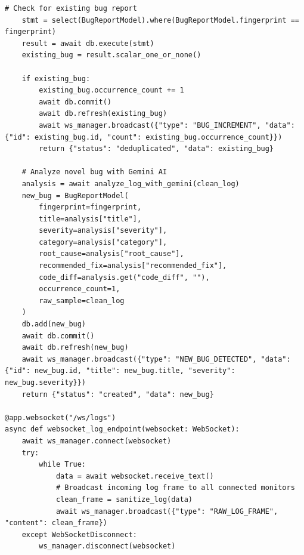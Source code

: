 \documentclass[12pt,a4paper]{article}
\begin{document}
\begin{lstlisting}[style=pystyle, caption={FastAPI Application Controller with Real-Time WebSocket Streaming}]
    # Check for existing bug report
    stmt = select(BugReportModel).where(BugReportModel.fingerprint == fingerprint)
    result = await db.execute(stmt)
    existing_bug = result.scalar_one_or_none()

    if existing_bug:
        existing_bug.occurrence_count += 1
        await db.commit()
        await db.refresh(existing_bug)
        await ws_manager.broadcast({"type": "BUG_INCREMENT", "data": {"id": existing_bug.id, "count": existing_bug.occurrence_count}})
        return {"status": "deduplicated", "data": existing_bug}

    # Analyze novel bug with Gemini AI
    analysis = await analyze_log_with_gemini(clean_log)
    new_bug = BugReportModel(
        fingerprint=fingerprint,
        title=analysis["title"],
        severity=analysis["severity"],
        category=analysis["category"],
        root_cause=analysis["root_cause"],
        recommended_fix=analysis["recommended_fix"],
        code_diff=analysis.get("code_diff", ""),
        occurrence_count=1,
        raw_sample=clean_log
    )
    db.add(new_bug)
    await db.commit()
    await db.refresh(new_bug)
    await ws_manager.broadcast({"type": "NEW_BUG_DETECTED", "data": {"id": new_bug.id, "title": new_bug.title, "severity": new_bug.severity}})
    return {"status": "created", "data": new_bug}

@app.websocket("/ws/logs")
async def websocket_log_endpoint(websocket: WebSocket):
    await ws_manager.connect(websocket)
    try:
        while True:
            data = await websocket.receive_text()
            # Broadcast incoming log frame to all connected monitors
            clean_frame = sanitize_log(data)
            await ws_manager.broadcast({"type": "RAW_LOG_FRAME", "content": clean_frame})
    except WebSocketDisconnect:
        ws_manager.disconnect(websocket)
\end{lstlisting}

\clearpage
\end{document}
